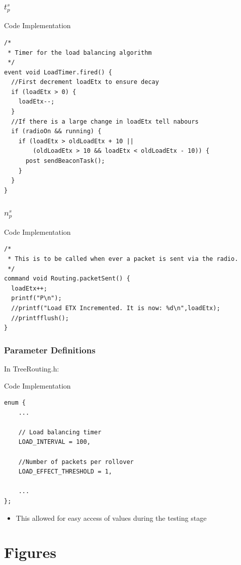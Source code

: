 \documentclass{beamer}
\begin{document}
\begin{frame}[fragile]
  \frametitle{$t_p^s$}
  \footnotesize{
    \begin{block}{Code Implementation}
      \begin{verbatim}
/* 
 * Timer for the load balancing algorithm
 */
event void LoadTimer.fired() {
  //First decrement loadEtx to ensure decay
  if (loadEtx > 0) {
    loadEtx--;
  }
  //If there is a large change in loadEtx tell nabours
  if (radioOn && running) {
    if (loadEtx > oldLoadEtx + 10 || 
        (oldLoadEtx > 10 && loadEtx < oldLoadEtx - 10)) {
      post sendBeaconTask();
    }
  }
}
      \end{verbatim}
    \end{block}
  }
\end{frame}

\begin{frame}[fragile]
  \frametitle{$n_p^s$}
  \footnotesize{
    \begin{block}{Code Implementation}
      \begin{verbatim}
/*
 * This is to be called when ever a packet is sent via the radio.
 */
command void Routing.packetSent() {
  loadEtx++;
  printf("P\n");
  //printf("Load ETX Incremented. It is now: %d\n",loadEtx);
  //printfflush();
}
      \end{verbatim}
    \end{block}
  }
\end{frame}


\begin{frame}[fragile]
  \frametitle{Parameter Definitions}
  In TreeRouting.h:
  \footnotesize{
    \begin{block}{Code Implementation}
      \begin{verbatim}
enum {
    ...

    // Load balancing timer
    LOAD_INTERVAL = 100,        

    //Number of packets per rollover
    LOAD_EFFECT_THRESHOLD = 1, 

    ...
}; 
      \end{verbatim}
    \end{block}

    \begin{itemize}
      \item This allowed for easy access of values during the testing stage
    \end{itemize}
  }
\end{frame}


\section{Figures}
\end{document}
